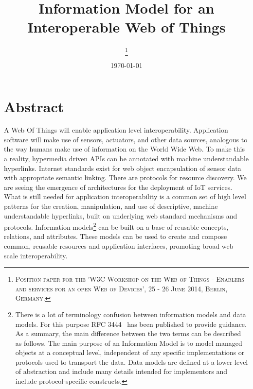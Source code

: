 \documentclass[journal]{IEEEtran}
\begin{document}
\title{Information Model for an \\Interoperable Web of Things}

\author{
\thanks{\textsc{
Position paper for the 'W3C Workshop on the Web of Things - Enablers and services for an open Web of Devices', 
25 - 26 June 2014, Berlin, Germany.}}
}

\date{\today}

\maketitle

\section{Abstract}

A Web Of Things will enable application level interoperability. Application software will make use of sensors, actuators, and other data sources, analogous to the way humans make use of information on the World Wide Web. To make this a reality, hypermedia driven APIs can be annotated with machine understandable hyperlinks. Internet standards exist for web object encapsulation of sensor data with appropriate semantic linking. There are protocols for resource discovery. We are seeing the emergence of architectures for the deployment of IoT services. What is still needed for application interoperability is a common set of high level patterns for the creation, manipulation, and use of descriptive, machine understandable hyperlinks, built on underlying web standard mechanisms and protocols. Information models\footnote{There is a lot of terminology confusion between information models and data models. For this purpose RFC 3444~\cite{RFC3444} has been published to provide guidance. As a summary, the main difference between the two terms can be described as follows. The main purpose of an Information Model is to model managed objects at a conceptual level, independent of any specific implementations or protocols used to transport the data. Data models are defined at a lower level of abstraction and include many details intended for implementors and include protocol-specific constructs.} can be built on a base of reusable concepts, relations, and attributes. These models can be used to create and compose common, reusable resources and application interfaces, promoting broad web scale interoperability. 
\end{document}
